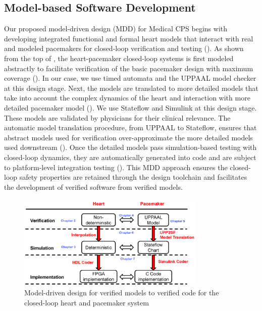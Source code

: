 \subsection{Model-based Software Development}
Our proposed model-driven design (MDD) for Medical CPS begins with developing integrated functional and formal heart models that interact with real and modeled pacemakers for closed-loop verification and testing (\cite{VHM_proc}). As shown from the top of , the heart-pacemaker closed-loop systems is first modeled abstractly to facilitate verification of the basic pacemaker design with maximum coverage (\cite{STTT13}). In our case, we use timed automata and the UPPAAL model checker at this design stage. Next, the models are translated to more detailed models that take into account the complex dynamics of the heart and interaction with more detailed pacemaker model (\cite{vhm_ecrts10, vhm_embc11,vhm_iccps11}). We use Stateflow and Simulink at this design stage. These models are validated by physicians for their clinical relevance. The automatic model translation procedure, from UPPAAL to Stateflow, ensures that abstract models used for verification over-approximate the more detailed models used downstream (\cite{RTAS12}). Once the detailed models pass simulation-based testing with closed-loop dynamics, they are automatically generated into code and are subject to platform-level integration testing (\cite{vhm_website}). This MDD approach ensures the closed-loop safety properties are retained through the design toolchain and facilitates the development of verified software from verified models.
\begin{figure}[t]
		\centering
		\includegraphics[width=0.8\textwidth]{figs/modeling_overview.jpg}
		\caption{\small Model-driven design for verified models to verified code for the closed-loop heart and pacemaker system}
		\label{fig:modeling_overview}
\end{figure}
